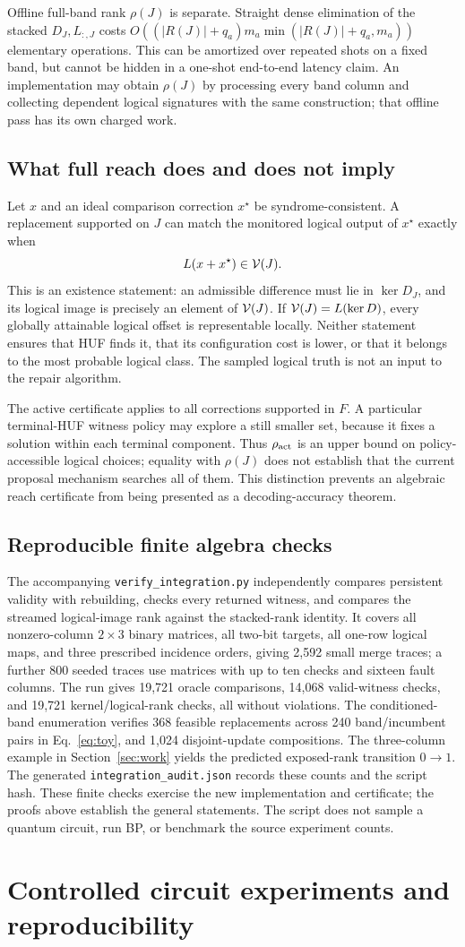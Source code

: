 Offline full-band rank $\rho(J)$ is separate. Straight dense elimination of the stacked $D_J,L_{:,J}$ costs $O((|R(J)|+q_a)m_a\min(|R(J)|+q_a,m_a))$ elementary operations. This can be amortized over repeated shots on a fixed band, but cannot be hidden in a one-shot end-to-end latency claim. An implementation may obtain $\rho(J)$ by processing every band column and collecting dependent logical signatures with the same construction; that offline pass has its own charged work.

\subsection{What full reach does and does not imply}
Let $x$ and an ideal comparison correction $x^\star$ be syndrome-consistent. A replacement supported on $J$ can match the monitored logical output of $x^\star$ exactly when
\[L(x+x^\star)\in\mathcal V(J).\]
This is an existence statement: an admissible difference must lie in $\ker D_J$, and its logical image is precisely an element of $\mathcal V(J)$. If $\mathcal V(J)=L(\ker D)$, every globally attainable logical offset is representable locally. Neither statement ensures that HUF finds it, that its configuration cost is lower, or that it belongs to the most probable logical class. The sampled logical truth is not an input to the repair algorithm.

The active certificate applies to all corrections supported in $F$. A particular terminal-HUF witness policy may explore a still smaller set, because it fixes a solution within each terminal component. Thus $\rho_{\rm act}$ is an upper bound on policy-accessible logical choices; equality with $\rho(J)$ does not establish that the current proposal mechanism searches all of them. This distinction prevents an algebraic reach certificate from being presented as a decoding-accuracy theorem.

\subsection{Reproducible finite algebra checks}
The accompanying \texttt{verify\_integration.py} independently compares persistent validity with rebuilding, checks every returned witness, and compares the streamed logical-image rank against the stacked-rank identity. It covers all nonzero-column $2\times3$ binary matrices, all two-bit targets, all one-row logical maps, and three prescribed incidence orders, giving 2,592 small merge traces; a further 800 seeded traces use matrices with up to ten checks and sixteen fault columns. The run gives 19,721 oracle comparisons, 14,068 valid-witness checks, and 19,721 kernel/logical-rank checks, all without violations. The conditioned-band enumeration verifies 368 feasible replacements across 240 band/incumbent pairs in Eq.~\eqref{eq:toy}, and 1,024 disjoint-update compositions. The three-column example in Section~\ref{sec:work} yields the predicted exposed-rank transition $0\to1$. The generated \texttt{integration\_audit.json} records these counts and the script hash. These finite checks exercise the new implementation and certificate; the proofs above establish the general statements. The script does not sample a quantum circuit, run BP, or benchmark the source experiment counts.

\section{Controlled circuit experiments and reproducibility}\label{app:study}

